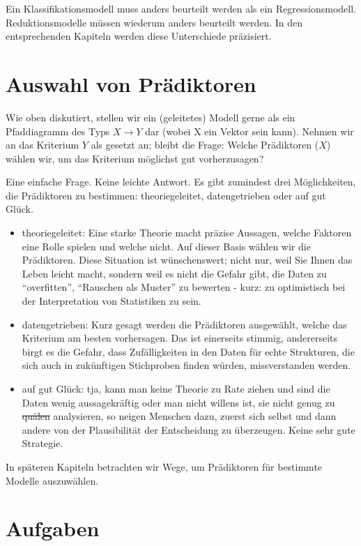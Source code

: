 \documentclass[12pt,ngerman,]{book}
\theoremstyle{definition}
\theoremstyle{definition}
\theoremstyle{remark}
\begin{document}
Ein Klassifikationsmodell muss anders beurteilt werden als ein
Regressionsmodell. Reduktionsmodelle müssen wiederum anders beurteilt
werden. In den entsprechenden Kapiteln werden diese Unterschiede
präzisiert.

\section{Auswahl von Prädiktoren}\label{auswahl-von-pradiktoren}

Wie oben diskutiert, stellen wir ein (geleitetes) Modell gerne als ein
Pfaddiagramm des Typs \(X \rightarrow Y\) dar (wobei X ein Vektor sein
kann). Nehmen wir an das Kriterium \(Y\) als gesetzt an; bleibt die
Frage: Welche Prädiktoren (\(X\)) wählen wir, um das Kriterium möglichst
gut vorherzusagen?

Eine einfache Frage. Keine leichte Antwort. Es gibt zumindest drei
Möglichkeiten, die Prädiktoren zu bestimmen: theoriegeleitet,
datengetrieben oder auf gut Glück.

\begin{itemize}
\item
  theoriegeleitet: Eine starke Theorie macht präzise Aussagen, welche
  Faktoren eine Rolle spielen und welche nicht. Auf dieser Basis wählen
  wir die Prädiktoren. Diese Situation ist wünschenswert; nicht nur,
  weil Sie Ihnen das Leben leicht macht, sondern weil es nicht die
  Gefahr gibt, die Daten zu ``overfitten'', ``Rauschen als Muster'' zu
  bewerten - kurz: zu optimistisch bei der Interpretation von
  Statistiken zu sein.
\item
  datengetrieben: Kurz gesagt werden die Prädiktoren ausgewählt, welche
  das Kriterium am besten vorhersagen. Das ist einerseits stimmig,
  andererseits birgt es die Gefahr, dass Zufälligkeiten in den Daten für
  echte Strukturen, die sich auch in zukünftigen Stichproben finden
  würden, missverstanden werden.
\item
  auf gut Glück: tja, kann man keine Theorie zu Rate ziehen und sind die
  Daten wenig aussagekräftig oder man nicht willens ist, sie nicht genug
  zu \sout{quälen} analysieren, so neigen Menschen dazu, zuerst sich
  selbst und dann andere von der Plausibilität der Entscheidung zu
  überzeugen. Keine sehr gute Strategie.
\end{itemize}

In späteren Kapiteln betrachten wir Wege, um Prädiktoren für bestimmte
Modelle auszuwählen.

\section{Aufgaben}\label{aufgaben-10}
\end{document}
